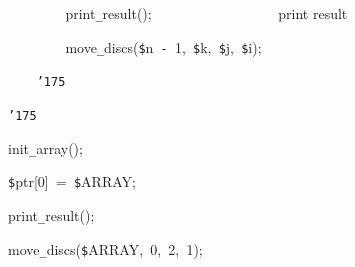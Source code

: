\documentclass[a4paper,10pt]{article}
\def\mc{\relax}
\begin{document}
\noindent
\mbox{}{\tt\mc \ }{\tt\mc \ }{\tt\mc \ }{\tt\mc \ }{\tt\mc \ }{\tt\mc \ }{\tt\mc \ }{\tt\mc \ }print{\tt\_}result();{\tt\mc \ }{\tt\mc \ }{\tt\mc \ }{\tt\mc \ }{\tt\mc \ }{\tt\mc \ }{\tt\mc \ }{\tt\mc \ }{\tt\mc \ }{\tt\mc \ }{\tt\mc \ }{\tt\mc \ }{\tt\mc \ }{\tt\mc \ }{\tt\mc \ }{\tt\mc \ }{\tt\mc \ }\rm\mc {\tt\#} print result
\tt\mc 

\noindent
\mbox{}{\tt\mc \ }{\tt\mc \ }{\tt\mc \ }{\tt\mc \ }{\tt\mc \ }{\tt\mc \ }{\tt\mc \ }{\tt\mc \ }move{\tt\_}discs({\tt\$}n{\tt\mc \ }{\tt -}{\tt\mc \ }1,{\tt\mc \ }{\tt\$}k,{\tt\mc \ }{\tt\$}j,{\tt\mc \ }{\tt\$}i);

\noindent
\mbox{}{\tt\mc \ }{\tt\mc \ }{\tt\mc \ }{\tt\mc \ }{\tt\char'175}

\noindent
\mbox{}{\tt\char'175}

\noindent
\mbox{}\hfill

\noindent
\mbox{}init{\tt\_}array();

\noindent
\mbox{}{\tt\$}ptr[0]{\tt\mc \ }={\tt\mc \ }{\tt\$}ARRAY;

\noindent
\mbox{}print{\tt\_}result();

\noindent
\mbox{}move{\tt\_}discs({\tt\$}ARRAY,{\tt\mc \ }0,{\tt\mc \ }2,{\tt\mc \ }1);

\rm\mc
\end{document}
